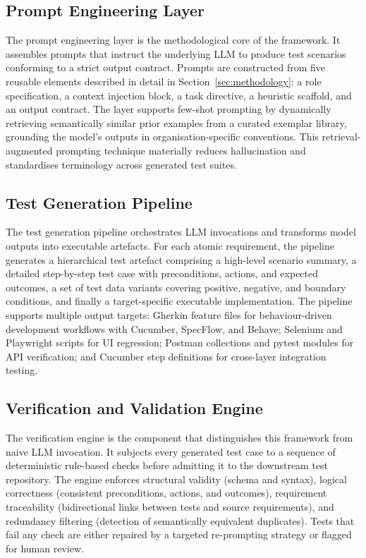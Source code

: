 \documentclass[conference]{IEEEtran}
\begin{document}
\subsection{Prompt Engineering Layer}

The prompt engineering layer is the methodological core of the framework. It assembles prompts that instruct the underlying LLM to produce test scenarios conforming to a strict output contract. Prompts are constructed from five reusable elements described in detail in Section~\ref{sec:methodology}: a role specification, a context injection block, a task directive, a heuristic scaffold, and an output contract. The layer supports few-shot prompting by dynamically retrieving semantically similar prior examples from a curated exemplar library, grounding the model's outputs in organisation-specific conventions. This retrieval-augmented prompting technique materially reduces hallucination and standardises terminology across generated test suites.

\subsection{Test Generation Pipeline}

The test generation pipeline orchestrates LLM invocations and transforms model outputs into executable artefacts. For each atomic requirement, the pipeline generates a hierarchical test artefact comprising a high-level scenario summary, a detailed step-by-step test case with preconditions, actions, and expected outcomes, a set of test data variants covering positive, negative, and boundary conditions, and finally a target-specific executable implementation. The pipeline supports multiple output targets: Gherkin feature files for behaviour-driven development workflows with Cucumber, SpecFlow, and Behave; Selenium and Playwright scripts for UI regression; Postman collections and pytest modules for API verification; and Cucumber step definitions for cross-layer integration testing.

\subsection{Verification and Validation Engine}

The verification engine is the component that distinguishes this framework from naive LLM invocation. It subjects every generated test case to a sequence of deterministic rule-based checks before admitting it to the downstream test repository. The engine enforces structural validity (schema and syntax), logical correctness (consistent preconditions, actions, and outcomes), requirement traceability (bidirectional links between tests and source requirements), and redundancy filtering (detection of semantically equivalent duplicates). Tests that fail any check are either repaired by a targeted re-prompting strategy or flagged for human review.
\end{document}
